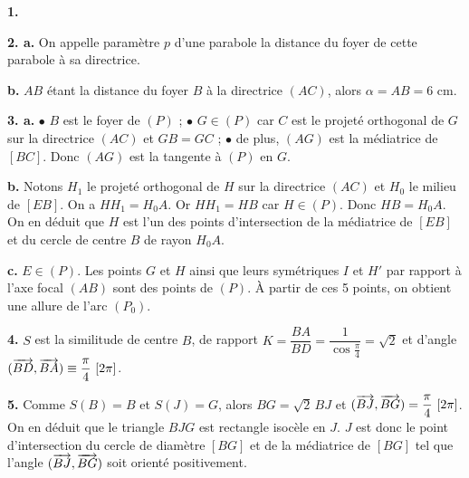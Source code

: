 \documentclass[11pt]{article}
\begin{document}
\textbf{1.} \begin{center}
\end{center}

\textbf{2. a.} On appelle paramètre $p$ d'une parabole la distance du foyer de cette parabole à sa directrice.

\textbf{b.} $AB$ étant la distance du foyer $B$ à la directrice $(AC)$, alors $\alpha = AB = 6$ cm.

\textbf{3. a.} $\bullet$ $B$ est le foyer de $(P)$ ; $\bullet$ $G \in (P)$ car $C$ est le projeté orthogonal de $G$ sur la directrice $(AC)$ et $GB = GC$ ; $\bullet$ de plus, $(AG)$ est la médiatrice de $[BC]$. Donc $(AG)$ est la tangente à $(P)$ en $G$.

\textbf{b.} Notons $H_1$ le projeté orthogonal de $H$ sur la directrice $(AC)$ et $H_0$ le milieu de $[EB]$. On a $HH_1 = H_0A$. Or $HH_1 = HB$ car $H \in (P)$. Donc $HB = H_0A$. On en déduit que $H$ est l'un des points d'intersection de la médiatrice de $[EB]$ et du cercle de centre $B$ de rayon $H_0A$.

\textbf{c.} $E \in (P)$. Les points $G$ et $H$ ainsi que leurs symétriques $I$ et $H'$ par rapport à l'axe focal $(AB)$ sont des points de $(P)$. À partir de ces 5 points, on obtient une allure de l'arc $(P_0)$.

\textbf{4.} $S$ est la similitude de centre $B$, de rapport $K = \dfrac{BA}{BD} = \dfrac{1}{\cos\frac{\pi}{4}} = \sqrt{2}$ et d'angle $(\overrightarrow{BD}, \overrightarrow{BA}) \equiv \dfrac{\pi}{4}\ [2\pi]$.

\textbf{5.} Comme $S(B) = B$ et $S(J) = G$, alors $BG = \sqrt{2}\,BJ$ et $(\vv{BJ}, \vv{BG}) = \dfrac{\pi}{4}\ [2\pi]$. On en déduit que le triangle $BJG$ est rectangle isocèle en $J$. $J$ est donc le point d'intersection du cercle de diamètre $[BG]$ et de la médiatrice de $[BG]$ tel que l'angle $(\overrightarrow{BJ}, \overrightarrow{BG})$ soit orienté positivement.
\end{document}
